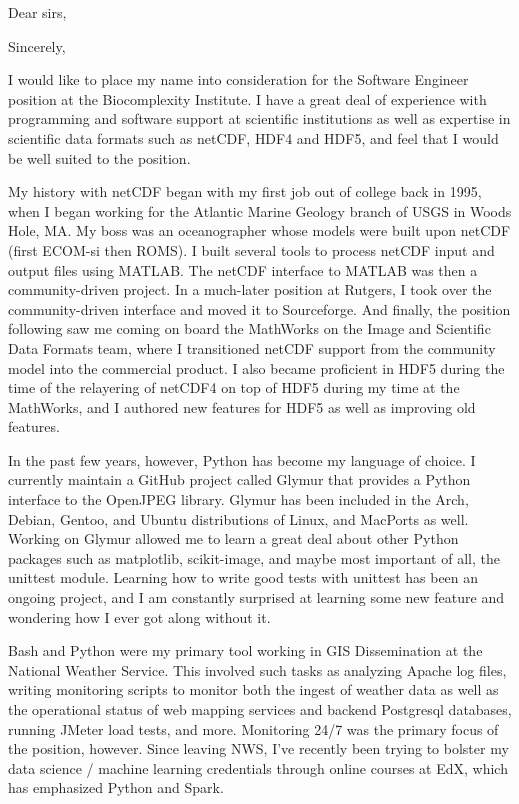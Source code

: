 \documentclass[11pt]{moderncv}  %
\begin{document}
\makecvtitle

\opening{Dear sirs,}
\closing{Sincerely,}


\makelettertitle

I would like to place my name into consideration for the Software Engineer position at the Biocomplexity Institute.   I have a great deal of experience with programming and software support at scientific institutions as well as expertise in scientific data formats such as netCDF, HDF4 and HDF5, and feel that I would be well suited to the position.

My history with netCDF began with my first job out of college back in 1995, 
when I began working for the Atlantic Marine Geology branch of USGS in Woods Hole,
MA.  My boss was an oceanographer whose models were built upon netCDF (first ECOM-si then ROMS).  I built several tools to process netCDF input and output files using
MATLAB.  The netCDF interface to MATLAB was then a community-driven project.
In a much-later position at Rutgers, I took over the community-driven interface
and moved it to Sourceforge.  And finally, the position following saw me
coming on board the MathWorks on the Image and Scientific Data Formats team, where I transitioned netCDF support from the community model into the commercial product.  I also became proficient in HDF5 during the time of the relayering of netCDF4 on top of HDF5 during my time at the MathWorks, and I authored new features for HDF5 as well as improving old features.

In the past few years, however, Python has become my language of choice.  I currently
maintain a GitHub project called Glymur that provides a Python interface
to the OpenJPEG library.  Glymur has been included in the Arch, Debian,
Gentoo, and Ubuntu distributions of Linux, and MacPorts as well.
Working on Glymur allowed me to learn a great deal about other Python
packages such as matplotlib, scikit-image, and maybe most important of
all, the unittest module.  Learning how to write good tests with unittest
has been an ongoing project, and I am constantly surprised at learning
some new feature and wondering how I ever got along without it.

Bash and Python were my primary tool working in GIS Dissemination at the National
Weather Service.  This involved such tasks as analyzing Apache log
files, writing monitoring scripts to monitor both the ingest of weather data as well as the operational status of web mapping services and backend Postgresql databases, running JMeter load tests, and more.
Monitoring 24/7 was the primary focus of the position, however.  Since
leaving NWS, I've recently been trying to bolster my data science /
machine learning credentials through online courses at EdX, which has
emphasized Python and Spark.
\end{document}
